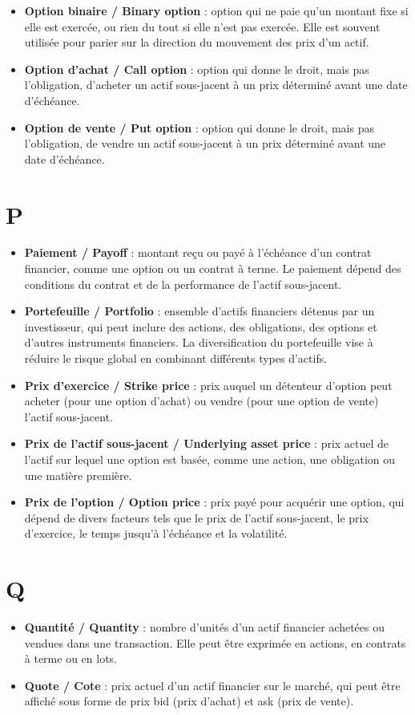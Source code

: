 \documentclass[a4paper,10pt]{article}
\begin{document}
\begin{multicols}{2}
\begin{itemize}
  \item \textbf{Option binaire / Binary option} : option qui ne paie qu’un montant fixe si elle est exercée, ou rien du tout si elle n’est pas exercée. Elle est souvent utilisée pour parier sur la direction du mouvement des prix d’un actif.
  \item \textbf{Option d’achat / Call option} : option qui donne le droit, mais pas l’obligation, d’acheter un actif sous-jacent à un prix déterminé avant une date d’échéance.
  \item \textbf{Option de vente / Put option} : option qui donne le droit, mais pas l’obligation, de vendre un actif sous-jacent à un prix déterminé avant une date d’échéance.
\end{itemize}

\section*{P}
\begin{itemize}
  \item \textbf{Paiement / Payoff} : montant reçu ou payé à l’échéance d’un contrat financier, comme une option ou un contrat à terme. Le paiement dépend des conditions du contrat et de la performance de l’actif sous-jacent.
  \item \textbf{Portefeuille / Portfolio} : ensemble d’actifs financiers détenus par un investisseur, qui peut inclure des actions, des obligations, des options et d’autres instruments financiers. La diversification du portefeuille vise à réduire le risque global en combinant différents types d’actifs.
  \item \textbf{Prix d’exercice / Strike price} : prix auquel un détenteur d’option peut acheter (pour une option d’achat) ou vendre (pour une option de vente) l’actif sous-jacent.
  \item \textbf{Prix de l’actif sous-jacent / Underlying asset price} : prix actuel de l’actif sur lequel une option est basée, comme une action, une obligation ou une matière première.
  \item \textbf{Prix de l’option / Option price} : prix payé pour acquérir une option, qui dépend de divers facteurs tels que le prix de l’actif sous-jacent, le prix d’exercice, le temps jusqu’à l’échéance et la volatilité.
\end{itemize}

\section*{Q}
\begin{itemize}
  \item \textbf{Quantité / Quantity} : nombre d’unités d’un actif financier achetées ou vendues dans une transaction. Elle peut être exprimée en actions, en contrats à terme ou en lots.
  \item \textbf{Quote / Cote} : prix actuel d’un actif financier sur le marché, qui peut être affiché sous forme de prix bid (prix d’achat) et ask (prix de vente).
\end{itemize}


\end{multicols}
\end{document}
